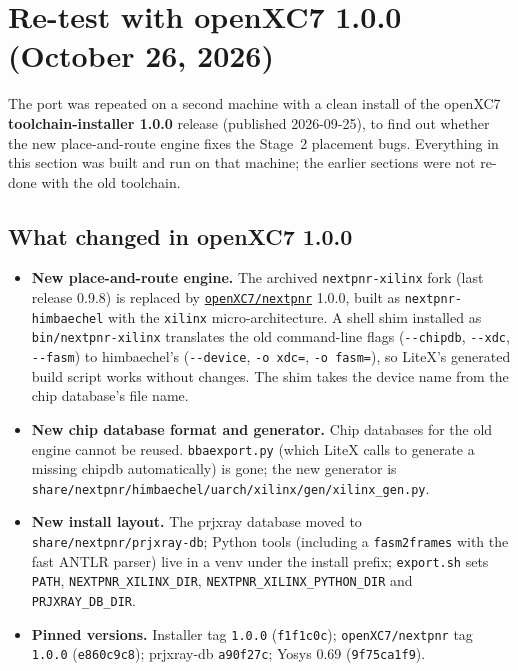 \documentclass[11pt]{article}
\begin{document}
\section{Re-test with openXC7 1.0.0 (October 26, 2026)}
\label{sec:v100}

The port was repeated on a second machine with a clean install of the
openXC7 \textbf{toolchain-installer 1.0.0} release (published
2026-09-25), to find out whether the new place-and-route engine fixes the
Stage~2 placement bugs. Everything in this section was built and run on
that machine; the earlier sections were not re-done with the old
toolchain.

\subsection{What changed in openXC7 1.0.0}

\begin{itemize}[nosep]
  \item \textbf{New place-and-route engine.} The archived
  \lstinline{nextpnr-xilinx} fork (last release 0.9.8) is replaced by
  \href{https://github.com/openXC7/nextpnr}{\texttt{openXC7/nextpnr}}
  1.0.0, built as \lstinline{nextpnr-himbaechel} with the
  \lstinline{xilinx} micro-architecture. A shell shim installed as
  \lstinline{bin/nextpnr-xilinx} translates the old command-line flags
  (\lstinline{--chipdb}, \lstinline{--xdc}, \lstinline{--fasm}) to
  himbaechel's (\lstinline{--device}, \lstinline{-o xdc=}, \lstinline{-o fasm=}),
  so LiteX's generated build script works without changes. The shim takes
  the device name from the chip database's file name.
  \item \textbf{New chip database format and generator.} Chip databases
  for the old engine cannot be reused. \lstinline{bbaexport.py} (which
  LiteX calls to generate a missing chipdb automatically) is gone; the new
  generator is
  \lstinline{share/nextpnr/himbaechel/uarch/xilinx/gen/xilinx_gen.py}.
  \item \textbf{New install layout.} The prjxray database moved to
  \lstinline{share/nextpnr/prjxray-db}; Python tools (including a
  \lstinline{fasm2frames} with the fast ANTLR parser) live in a venv under
  the install prefix; \lstinline{export.sh} sets \lstinline{PATH},
  \lstinline{NEXTPNR_XILINX_DIR}, \lstinline{NEXTPNR_XILINX_PYTHON_DIR} and
  \lstinline{PRJXRAY_DB_DIR}.
  \item \textbf{Pinned versions.} Installer tag \lstinline{1.0.0}
  (\lstinline{f1f1c0c}); \lstinline{openXC7/nextpnr} tag \lstinline{1.0.0}
  (\lstinline{e860c9c8}); prjxray-db \lstinline{a90f27c}; Yosys 0.69
  (\lstinline{9f75ca1f9}).
\end{itemize}
\end{document}
